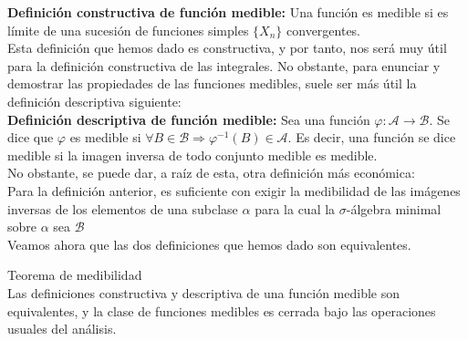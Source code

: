 \textbf{Definición constructiva de función medible:} Una función es medible si es límite de una sucesión de funciones simples $\{X_n\}$ convergentes.\\

Esta definición que hemos dado es constructiva, y por tanto, nos será muy útil para la definición constructiva de las integrales. No obstante, para enunciar y demostrar las propiedades de las funciones medibles, suele ser más útil la definición descriptiva siguiente:\\

\textbf{Definición descriptiva de función medible:} Sea una función $\varphi : \mathcal{A} \rightarrow \mathcal{B}$. Se dice que $\varphi$ es medible si $\forall B \in \mathcal{B} \Rightarrow \varphi^{-1}(B) \in \mathcal{A}$. Es decir, una función se dice medible si la imagen inversa de todo conjunto medible es medible.\\

No obstante, se puede dar, a raíz de esta, otra definición más económica:\\

Para la definición anterior, es suficiente con exigir la medibilidad de las imágenes inversas de los elementos de una subclase $\alpha$ para la cual la $\sigma$-álgebra minimal sobre $\alpha$ sea $\mathcal{B}$\\

Veamos ahora que las dos definiciones que hemos dado son equivalentes.

\begin{theorem} Teorema de medibilidad\\
Las definiciones constructiva y descriptiva de una función medible son equivalentes, y la clase de funciones medibles es cerrada bajo las operaciones usuales del análisis.
\end{theorem}

